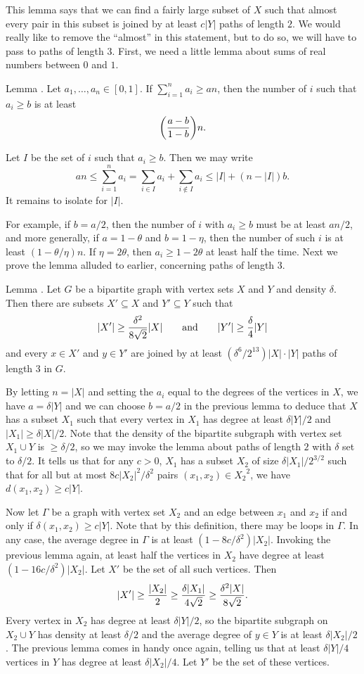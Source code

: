 This lemma says that we can find a fairly large subset of $X$ such that almost every pair in this
subset is joined by at least $c|Y|$ paths of length $2$. We would really like to remove the ``almost''
in this statement, but to do so, we will have to pass to paths of length $3$.
First, we need a little lemma about sums of real numbers between $0$ and $1$.

\proclaim Lemma {\advthm}. Let $a_1,\ldots, a_n\in [0,1]$. If $\sum_{i=1}^n a_i \ge an$, then
the number of $i$ such that $a_i\ge b$ is at least
$$ \biggl( {a-b\over 1-b} \biggr) n.$$

\proof Let $I$ be the set of $i$ such that $a_i\ge b$. Then we may write
$$ an \le \sum_{i=1}^n a_i = \sum_{i\in I} a_i + \sum_{i\notin I} a_i
\le |I| + (n-|I|)b.$$
It remains to isolate for $|I|$.\slug

For example, if $b = a/2$, then the number of $i$ with $a_i\ge b$ must be at least $an/2$, and more
generally, if $a= 1-\theta$ and $b=1-\eta$, then the number of such $i$ is at least $(1-\theta/\eta)n$.
If $\eta = 2\theta$, then $a_i\ge 1-2\theta$ at least half the time.
Next we prove the lemma alluded to earlier, concerning paths of length $3$.

\proclaim Lemma {\advthm}. Let $G$ be a bipartite graph with vertex sets $X$ and $Y$ and density $\delta$.
Then there are subsets $X'\subseteq X$ and $Y'\subseteq Y$ such that
$$|X'| \ge {\delta^2\over 8\sqrt 2} |X|\qquad\hbox{and}\qquad
|Y'|\ge {\delta\over 4}|Y|$$
and every $x\in X'$ and $y\in Y'$ are joined by at least $(\delta^6/2^{13}) |X|\cdot |Y|$ paths
of length $3$ in $G$.

\proof By letting $n = |X|$ and setting the $a_i$ equal to the degrees of the vertices in $X$, we have
$a = \delta|Y|$
and we can choose $b=a/2$ in the previous lemma
to deduce that $X$ has a subset $X_1$ such that every vertex in $X_1$ has degree at least
$\delta|Y|/2$ and $|X_1|\ge \delta|X|/2$. Note that the density of the bipartite subgraph with
vertex set $X_1\cup Y$ is $\ge \delta/2$,
so we may invoke the lemma about paths of length $2$ with $\delta$ set to $\delta/2$. It tells us that
for any $c>0$, $X_1$ has a subset $X_2$ of size $\delta|X_1|/2^{3/2}$ such that for all but at most
$8c|X_2|^2/\delta^2$ pairs $(x_1,x_2)\in {X_2}^2$, we have $d(x_1,x_2) \ge c|Y|$.

Now let $\Gamma$ be a graph with vertex set $X_2$ and an edge between $x_1$ and $x_2$ if and only if
$\delta(x_1,x_2)\ge c|Y|$. Note that by this definition, there may be loops in $\Gamma$. In any case,
the average degree in $\Gamma$ is at least $(1-8c/\delta^2)|X_2|$. Invoking the previous lemma again,
at least half the vertices in $X_2$ have degree at least $(1-16c/\delta^2)|X_2|$. Let $X'$ be the set of
all such vertices. Then
$$|X'| \ge {|X_2|\over 2} \ge {\delta|X_1|\over 4\sqrt 2} \ge {\delta^2 |X|\over 8\sqrt 2}.$$
Every vertex in $X_2$ has degree at least $\delta |Y|/2$, so the bipartite subgraph on $X_2\cup Y$
has density at least $\delta/2$ and the average degree of $y\in Y$ is at least $\delta|X_2|/2$. The
previous lemma comes in handy once again, telling us that at least $\delta|Y|/4$ vertices in $Y$ has
degree at least $\delta|X_2|/4$. Let $Y'$ be the set of these vertices.

